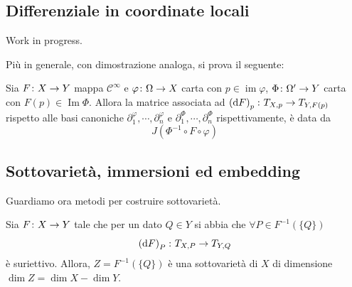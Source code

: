 \documentclass[a4paper]{article}
\begin{document}
\subsection{Differenziale in coordinate locali}

Work in progress.

Più in generale, con dimostrazione analoga, si prova il seguente:

\begin{snippetproposition}{}
    Sia \(F \colon X \to Y\) mappa \(\mathcal C^\infty\)
    e \(\varphi \colon \Omega \to X\) carta con \(p \in \operatorname{im}\varphi\),
    \(\Phi \colon \Omega' \to Y\) carta con \(F(p) \in \operatorname{Im}\Phi\).
    Allora la matrice associata ad \(\left(\text{d}F\right)_p \colon T_{X,p} \to T_{Y, F(p)}\)
    rispetto alle basi canoniche \(\partial_1^\varphi, \cdots, \partial_n^\varphi\)
    e \(\partial_1^\Phi, \cdots, \partial_n^\Phi\) rispettivamente, è data da
    \[
        J(\Phi^{-1} \circ F \circ \varphi)
    \]
\end{snippetproposition}

\subsection{Sottovarietà, immersioni ed embedding}

Guardiamo ora metodi per costruire sottovarietà.

\begin{snippettheorem}{}
    Sia \(F \colon X \to Y\) tale che
    per un dato \(Q \in Y\) si abbia che \(\forall P \in F^{-1}(\{Q\})\)
    \[
        \left(\text{d}F\right)_P \colon T_{X,P} \to T_{Y, Q}
    \]
    è suriettivo. Allora, \(Z = F^{-1}(\{Q\})\) è una sottovarietà di \(X\)
    di dimensione \(\dim Z = \dim X - \dim Y\).
\end{snippettheorem}

\begin{center}
\end{center}
\end{document}

